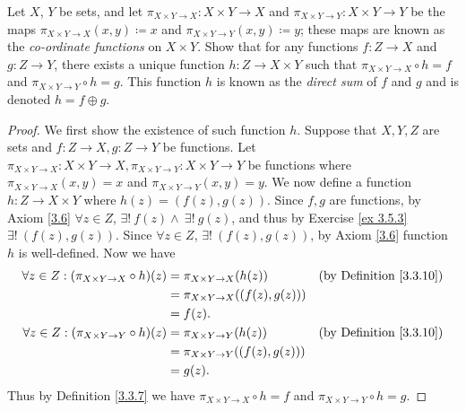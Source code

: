 \begin{exercise}\label{ex 3.5.7}
    Let \(X\), \(Y\) be sets, and let \(\pi_{X \times Y \to X} : X \times Y \to X\) and \(\pi_{X \times Y \to Y} : X \times Y \to Y\) be the maps \(\pi_{X \times Y \to X}(x, y) \coloneqq x\) and \(\pi_{X \times Y \to Y}(x, y) \coloneqq y\);
    these maps are known as the \emph{co-ordinate functions} on \(X \times Y\).
    Show that for any functions \(f : Z \to X\) and \(g : Z \to Y\), there exists a unique function \(h : Z \to X \times Y\) such that \(\pi_{X \times Y \to X} \circ h = f\) and \(\pi_{X \times Y \to Y} \circ h = g\).
    This function \(h\) is known as the \emph{direct sum} of \(f\) and \(g\) and is denoted \(h = f \oplus g\).
\end{exercise}

\begin{proof}
    We first show the existence of such function \(h\).
    Suppose that \(X, Y, Z\) are sets and \(f : Z \to X, g : Z \to Y\) be functions.
    Let \(\pi_{X \times Y \to X} : X \times Y \to X, \pi_{X \times Y \to Y} : X \times Y \to Y\) be functions where \(\pi_{X \times Y \to X}(x, y) = x\) and \(\pi_{X \times Y \to Y}(x, y) = y\).
    We now define a function \(h : Z \to X \times Y\) where \(h(z) = (f(z), g(z))\).
    Since \(f, g\) are functions, by Axiom \ref{3.6} \(\forall z \in Z\), \(\exists!\ f(z) \land \ \exists!\ g(z)\), and thus by Exercise \ref{ex 3.5.3} \(\exists!\ (f(z), g(z))\).
    Since \(\forall z \in Z\), \(\exists!\ (f(z), g(z))\), by Axiom \ref{3.6} function \(h\) is well-defined.
    Now we have
    \begin{align*}
        \forall z \in Z : (\pi_{X \times Y \to X} \circ h)(z) & = \pi_{X \times Y \to X}(h(z))         & \text{(by Definition \ref{3.3.10})} \\
                                                              & = \pi_{X \times Y \to X}((f(z), g(z)))                                       \\
                                                              & = f(z).                                                                      \\
        \forall z \in Z : (\pi_{X \times Y \to Y} \circ h)(z) & = \pi_{X \times Y \to Y}(h(z))         & \text{(by Definition \ref{3.3.10})} \\
                                                              & = \pi_{X \times Y \to Y}((f(z), g(z)))                                       \\
                                                              & = g(z).
    \end{align*}
    Thus by Definition \ref{3.3.7} we have \(\pi_{X \times Y \to X} \circ h = f\) and \(\pi_{X \times Y \to Y} \circ h = g\).


\end{proof}
